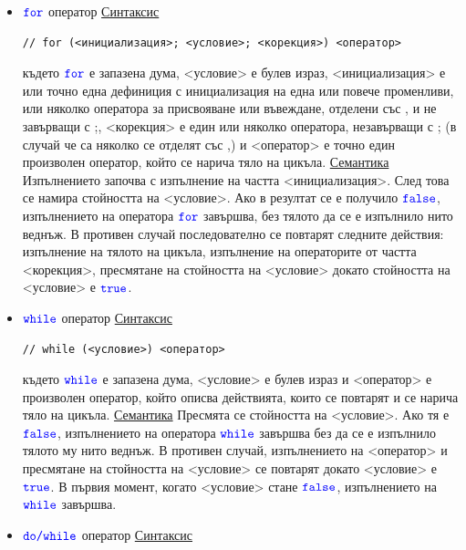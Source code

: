 \documentclass{article}
\begin{document}
\begin{itemize}
    \item $\textcolor{blue}{\texttt{for}}$ оператор \newline
\underline{Синтаксис}
\begin{lstlisting}[style=cpp]
// for (<инициализация>; <условие>; <корекция>) <оператор>    
\end{lstlisting}
където $\textcolor{blue}{\texttt{for}}$ е запазена дума, <условие> е булев израз, <инициализация> е или точно една дефиниция с инициализация на една или повече променливи,
или няколко оператора за присвояване или въвеждане, отделени със , и не завърващи с ;, <корекция> е един или няколко оператора, незавърващи с ;
(в случай че са няколко се отделят със ,) и <оператор> е точно един произволен оператор, който се нарича тяло на цикъла. \newline
\underline{Семантика} \newline
Изпълнението започва с изпълнение на частта <инициализация>. След това се намира стойността на <условие>. Ако в резултат се е
получило $\textcolor{blue}{\texttt{false}}$, изпълнението на оператора $\textcolor{blue}{\texttt{for}}$ завършва, без тялото да се е изпълнило нито веднъж. В противен случай последователно
се повтарят следните действия: изпълнение на тялото на цикъла, изпълнение на операторите от частта <корекция>, пресмятане на
стойността на <условие> докато стойността на <условие> е $\textcolor{blue}{\texttt{true}}$.
    \item $\textcolor{blue}{\texttt{while}}$ оператор \newline
\underline{Синтаксис}
\begin{lstlisting}[style=cpp]
// while (<условие>) <оператор>    
\end{lstlisting}
където $\textcolor{blue}{\texttt{while}}$ е запазена дума, <условие> е булев израз и <оператор> е произволен оператор, който
описва действията, които се повтарят и се нарича тяло на цикъла. \newline
\underline{Семантика} \newline
Пресмята се стойността на <условие>. Ако тя е $\textcolor{blue}{\texttt{false}}$, изпълнението на оператора $\textcolor{blue}{\texttt{while}}$ завършва без да се е изпълнило тялото му
нито веднъж. В противен случай, изпълнението на <оператор> и пресмятане на стойността на <условие> се повтарят докато <условие>
е $\textcolor{blue}{\texttt{true}}$. В първия момент, когато <условие> стане $\textcolor{blue}{\texttt{false}}$, изпълнението на $\textcolor{blue}{\texttt{while}}$ завършва.
    \item $\textcolor{blue}{\texttt{do/while}}$ оператор \newline
\underline{Синтаксис}
\begin{lstlisting}[style=cpp]

\end{lstlisting}
\end{itemize}
\end{document}
